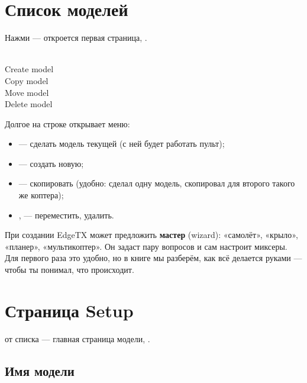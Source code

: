 \section{Список моделей}

Нажми  --- откроется первая страница, .

\begin{center}
%
{\\Create model\\Copy model\\Move model\\Delete model}
\end{center}

Долгое  на строке открывает меню:
\begin{itemize}
  \item {} --- сделать модель текущей (с ней будет работать пульт);
  \item {} --- создать новую;
  \item {} --- скопировать (удобно: сделал одну модель, скопировал для второго
        такого же коптера);
  \item {},  --- переместить, удалить.
\end{itemize}

При создании EdgeTX может предложить \textbf{мастер} (wizard): «самолёт», «крыло», «планер»,
«мультикоптер». Он задаст пару вопросов и сам настроит миксеры. Для первого раза это удобно,
но в книге мы разберём, как всё делается руками --- чтобы ты понимал, что происходит.

\section{Страница Setup}

 от списка --- главная страница модели, .

\begin{center}
\end{center}

\subsection{Имя модели}

